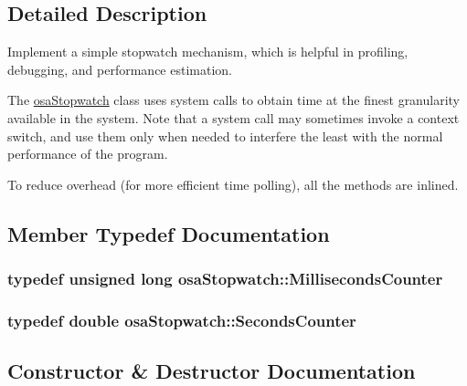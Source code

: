 \subsection{Detailed Description}
Implement a simple stopwatch mechanism, which is helpful in profiling, debugging, and performance estimation.

The \hyperlink{classosa_stopwatch}{osa\+Stopwatch} class uses system calls to obtain time at the finest granularity available in the system. Note that a system call may sometimes invoke a context switch, and use them only when needed to interfere the least with the normal performance of the program.

To reduce overhead (for more efficient time polling), all the methods are inlined. 

\subsection{Member Typedef Documentation}
\hypertarget{classosa_stopwatch_a1965d1eca46d883235a26d1ee2920c2f}{}
\subsubsection[{Milliseconds\+Counter}]{\setlength{\rightskip}{0pt plus 5cm}typedef unsigned long {\bf osa\+Stopwatch\+::\+Milliseconds\+Counter}}\label{classosa_stopwatch_a1965d1eca46d883235a26d1ee2920c2f}
\hypertarget{classosa_stopwatch_af99ed194ad28f06f68aa66c81ae93517}{}
\subsubsection[{Seconds\+Counter}]{\setlength{\rightskip}{0pt plus 5cm}typedef double {\bf osa\+Stopwatch\+::\+Seconds\+Counter}}\label{classosa_stopwatch_af99ed194ad28f06f68aa66c81ae93517}


\subsection{Constructor \& Destructor Documentation}
\hypertarget{classosa_stopwatch_ac84e6730acab9c10fdd183fbc570dd48}{}
